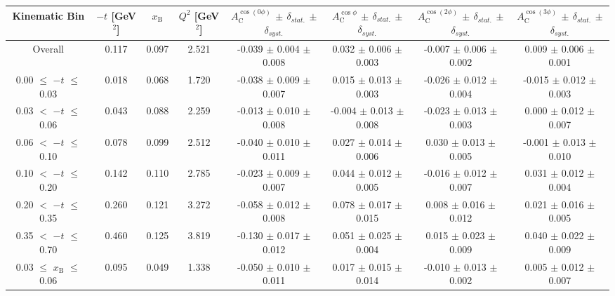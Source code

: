 \begin{table}[width=15cm]
 \begin{center}
\resizebox{16cm}{!} {
  \begin{tabular}{|c|c|c|c|c|c|c|c|}
\hline
Kinematic Bin &  $-t$ [GeV$^{2}$] & $x_{\textrm{B}}$ & $Q^{2}$ [GeV$^{2}$] & 
$A_{\textrm{C}}^{\cos(0\phi)}$ $\pm$ $\delta_{stat.}$ $\pm$ $\delta_{syst.}$ & $A_{\textrm{C}}^{\cos \phi}$ $\pm$ $\delta_{stat.}$ $\pm$ $\delta_{syst.}$
& $A_{\textrm{C}}^{\cos(2\phi)}$ $\pm$ $\delta_{stat.}$ $\pm$ $\delta_{syst.}$ & $A_{\textrm{C}}^{\cos(3\phi)}$ $\pm$ $\delta_{stat.}$ $\pm$ $\delta_{syst.}$ \\
\hline
\hline
Overall &  0.117 & 0.097 &  2.521 &  -0.039 $\pm$  0.004 $\pm$  0.008 & 
0.032  $\pm$  0.006 $\pm$   0.003 &  -0.007  $\pm$  0.006  $\pm$   0.002 &  0.009  $\pm$   0.006   $\pm$   0.001 \\
\hline
0.00 $\leqslant$ $-t$ $\leqslant$ 0.03 &  0.018 & 0.068 &  1.720 &  -0.038  $\pm$  0.009 $\pm$ 0.007 & 
0.015  $\pm$  0.013  $\pm$   0.003 &  -0.026  $\pm$  0.012 $\pm$  0.004 &  -0.015   $\pm$  0.012   $\pm$   0.003\\
0.03 $<$ $-t$ $\leqslant$ 0.06 &  0.043 & 0.088 &  2.259& -0.013  $\pm$  0.010  $\pm$   0.008 &
 -0.004 $\pm$  0.013  $\pm$   0.008 &  -0.023  $\pm$  0.013  $\pm$  0.003 &  0.000   $\pm$  0.012   $\pm$   0.007\\
0.06 $<$ $-t$ $\leqslant$ 0.10 &  0.078 & 0.099 &  2.512 & -0.040  $\pm$  0.010  $\pm$  0.011 & 
0.027 $\pm$  0.014  $\pm$   0.006 & 0.030  $\pm$  0.013 $\pm$   0.005 &  -0.001   $\pm$  0.013  $\pm$    0.010\\
0.10 $<$ $-t$ $\leqslant$ 0.20 &  0.142 & 0.110 &  2.785 &  -0.023  $\pm$  0.009   $\pm$  0.007 & 
0.044 $\pm$  0.012  $\pm$   0.005 &  -0.016  $\pm$  0.012  $\pm$  0.007 & 0.031   $\pm$  0.012    $\pm$  0.004\\
0.20 $<$ $-t$ $\leqslant$ 0.35 &  0.260 & 0.121 &  3.272 &  -0.058 $\pm$   0.012  $\pm$  0.008 &
0.078 $\pm$  0.017  $\pm$ 0.015 & 0.008 $\pm$   0.016  $\pm$  0.012 & 0.021  $\pm$   0.016   $\pm$   0.005\\
0.35 $<$ $-t$ $\leqslant$ 0.70 &  0.460 & 0.125 &  3.819 &  -0.130  $\pm$  0.017  $\pm$   0.012 & 
0.051 $\pm$  0.025  $\pm$   0.004 & 0.015 $\pm$   0.023  $\pm$  0.009 & 0.040   $\pm$  0.022   $\pm$ 0.009\\
\hline
0.03 $\leqslant$ $x_{\textrm{B}}$ $\leqslant$ 0.06 &  0.095 & 0.049 &  1.338 &  -0.050  $\pm$  0.010  $\pm$   0.011 & 
 0.017  $\pm$  0.015  $\pm$   0.014 & -0.010 $\pm$  0.013 $\pm$   0.002 &  0.005   $\pm$  0.012  $\pm$    0.007\\

\end{tabular}}
\end{center}
\end{table}
